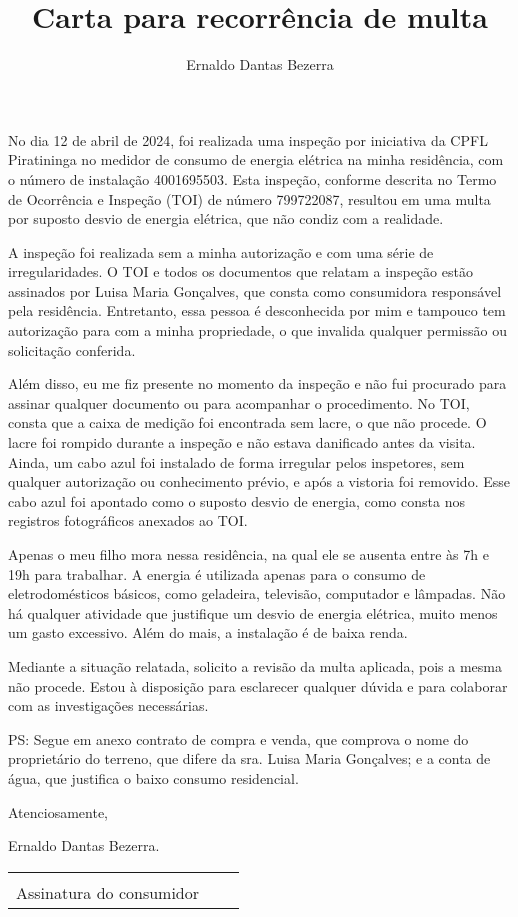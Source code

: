 \documentclass[12pt]{article}
\title{Carta para recorrência de multa}
\author{Ernaldo Dantas Bezerra}
\begin{document}
\thispagestyle{empty}
 
No dia 12 de abril de 2024, foi realizada uma inspeção por iniciativa da CPFL Piratininga no medidor de consumo de energia elétrica na minha residência, com o número de instalação 4001695503. Esta inspeção, conforme descrita no Termo de Ocorrência e Inspeção (TOI) de número 799722087, resultou em uma multa por suposto desvio de energia elétrica, que não condiz com a realidade.

A inspeção foi realizada sem a minha autorização e com uma série de irregularidades. O TOI e todos os documentos que relatam a inspeção estão assinados por Luisa Maria Gonçalves, que consta como consumidora responsável pela residência. Entretanto, essa pessoa é desconhecida por mim e tampouco tem autorização para com a minha propriedade, o que invalida qualquer permissão ou solicitação conferida.

Além disso, eu me fiz presente no momento da inspeção e não fui procurado para assinar qualquer documento ou para acompanhar o procedimento. No TOI, consta que a caixa de medição foi encontrada sem lacre, o que não procede. O lacre foi rompido durante a inspeção e não estava danificado antes da visita. Ainda, um cabo azul foi instalado de forma irregular pelos inspetores, sem qualquer autorização ou conhecimento prévio, e após a vistoria foi removido. Esse cabo azul foi apontado como o suposto desvio de energia, como consta nos registros fotográficos anexados ao TOI. 

Apenas o meu filho mora nessa residência, na qual ele se ausenta entre às 7h e 19h para trabalhar. A energia é utilizada apenas para o consumo de eletrodomésticos básicos, como geladeira, televisão, computador e lâmpadas. Não há qualquer atividade que justifique um desvio de energia elétrica, muito menos um gasto excessivo. Além do mais, a instalação é de baixa renda.

Mediante a situação relatada, solicito a revisão da multa aplicada, pois a mesma não procede. Estou à disposição para esclarecer qualquer dúvida e para colaborar com as investigações necessárias.

PS: Segue em anexo contrato de compra e venda, que comprova o nome do proprietário do terreno, que difere da sra. Luisa Maria Gonçalves; e a conta de água, que justifica o baixo consumo residencial.

\vspace*{5mm}
Atenciosamente,

Ernaldo Dantas Bezerra.

\begin{table}[!h]
    \centering
    \vspace{15mm}
    \begin{tabular}{@{}p{3in}p{2in}p{2in}@{}}
        \hrulefill &&\\
        \hspace*{1.2cm} Assinatura do consumidor &&\\
    \end{tabular}
\end{table}
\end{document}
